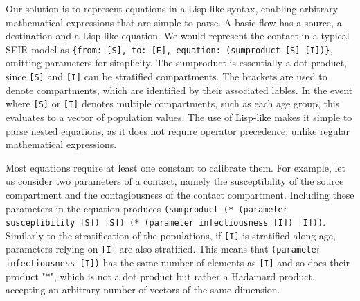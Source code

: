 Our solution is to represent equations in a Lisp-like syntax, enabling arbitrary mathematical expressions that are simple to parse. A basic flow has a source, a destination and a Lisp-like equation. We would represent the contact in a typical SEIR model as \texttt{\{from: [S], to: [E], equation: (sumproduct [S] [I])\}}, omitting parameters for simplicity. The sumproduct is essentially a dot product, since \texttt{[S]} and \texttt{[I]} can be stratified compartments. The brackets are used to denote compartments, which are identified by their associated lables. In the event where \texttt{[S]} or \texttt{[I]} denotes multiple compartments, such as each age group, this evaluates to a vector of population values. The use of Lisp-like makes it simple to parse nested equations, as it does not require operator precedence, unlike regular mathematical expressions.

Most equations require at least one constant to calibrate them. For example, let us consider two parameters of a contact, namely the susceptibility of the source compartment and the contagiousness of the contact compartment. Including these parameters in the equation produces \texttt{(sumproduct (* (parameter susceptibility [S]) [S]) (* (parameter infectiousness [I]) [I]))}.
Similarly to the stratification of the populations, if \texttt{[I]} is stratified along age, parameters relying on \texttt{[I]} are also stratified. This means that \texttt{(parameter infectiousness [I])} has the same number of elements as \texttt{[I]} and so does their product "*", which is not a dot product but rather a Hadamard product, accepting an arbitrary number of vectors of the same dimension.

